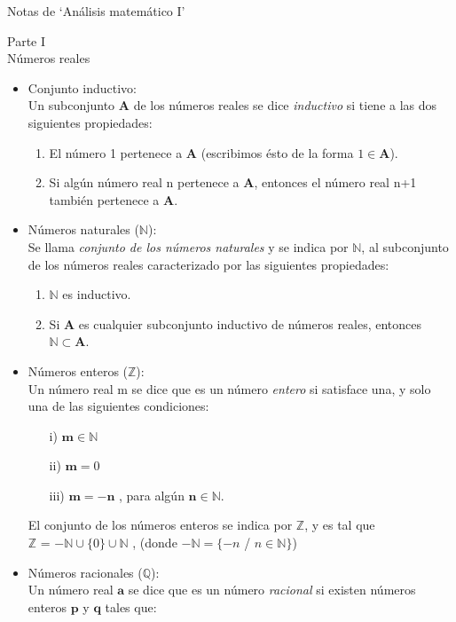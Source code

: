 \documentclass[a4paper,11pt]{report}
\begin{document}
\flushleft
\centerline{Notas de ‘Análisis matemático I’ }
{\large Parte I} \\[5pt]
{\huge Números reales}
\begin{itemize}
\renewcommand{\labelitemi}{$\bullet$}
\item Conjunto inductivo: \\
Un subconjunto $\mathbf{A}$ de los números reales se dice \emph{inductivo} si tiene a las dos siguientes propiedades:
\begin{enumerate}
\item El número 1 pertenece a $\mathbf{A}$ (escribimos ésto de la forma $1 \in \mathbf{A}$).
\item Si algún número real n pertenece a $\mathbf{A}$, entonces el número real n+1 también pertenece a $\mathbf{A}$.
\end{enumerate}
\item Números naturales ($\mathbb{N}$): \\
Se llama \emph{conjunto de los números naturales} y se indica por $\mathbb{N}$, al subconjunto de los números reales caracterizado por las siguientes propiedades:
\begin{enumerate}
\item $\mathbb{N}$ es inductivo.
\item Si $\mathbf{A}$ es cualquier subconjunto inductivo de números reales, entonces $\mathbb{N} \subset \mathbf{A}$.
\end{enumerate}
\item Números enteros ($\mathbb{Z}$): \\
Un número real m se dice que es un número \emph{entero} si satisface una, y solo una de las siguientes condiciones:
\begin{itemize}
\item[i)] $\mathbf{m \in \mathbb{N}}$
\item[ii)] $\mathbf{m} = 0$
\item[iii)] $\mathbf{m} =\mathbf{-n}$ , para algún $\mathbf{n} \in \mathbb{N}$.
\end{itemize}
El conjunto de los números enteros se indica por $\mathbb{Z}$, y es tal que \\
$\mathbb{Z}$ = { $ -\mathbb{N} \cup \{0\} \cup \mathbb{N}$ }, (donde $ -\mathbb{N} = \{-n$ / $n\in\mathbb{N}\}$)
\item Números racionales ($\mathbb{Q}$): \\
Un número real $\mathbf{a}$ se dice que es un número \emph{racional} si existen números enteros $\mathbf{p}$ y $\mathbf{q}$ tales que: \\

\end{itemize}
\end{document}
